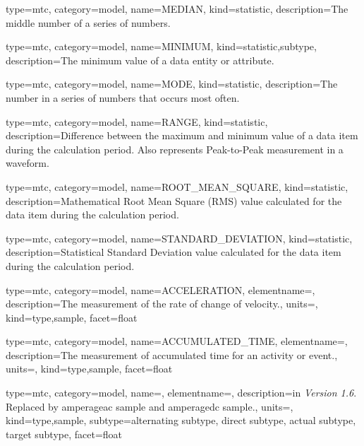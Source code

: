 {
  type=mtc,
  category=model,
  name={MEDIAN},
  kind={statistic},
  description={The middle number of a series of numbers.}
}


{
  type=mtc,
  category=model,
  name={MINIMUM},
  kind={statistic,subtype},
  description={The minimum value of a data entity or attribute.}
}


{
  type=mtc,
  category=model,
  name={MODE},
  kind={statistic},
  description={The number in a series of numbers that occurs most often.}
}


{
  type=mtc,
  category=model,
  name={RANGE},
  kind={statistic},
  description={Difference between the maximum and minimum value of a data item during the calculation period.  Also represents Peak-to-Peak measurement in a waveform.}
}


{
  type=mtc,
  category=model,
  name={ROOT\_MEAN\_SQUARE},
  kind={statistic},
  description={Mathematical Root Mean Square (RMS) value calculated for the data item during the calculation period.}
}


{
  type=mtc,
  category=model,
  name={STANDARD\_DEVIATION},
  kind={statistic},
  description={Statistical Standard Deviation value calculated for the data item during the calculation period.}
}


{
  type=mtc,
  category=model,
  name={ACCELERATION},
  elementname=,
  description={The measurement of the rate of change of velocity.},
  units=,
  kind={type,sample},
  facet={\gls{float}}
}


{
  type=mtc,
  category=model,
  name={ACCUMULATED\_TIME},
  elementname=,
  description={The measurement of accumulated time for an activity or event.},
  units=,
  kind={type,sample},
  facet={\gls{float}}
}


{
  type=mtc,
  category=model,
  name=,
  elementname=,
  description={\DEPRECATED in \textit{Version 1.6}. Replaced by \gls{amperageac sample} and \gls{amperagedc sample}.},
  units=,
  kind={type,sample},
  subtype={\gls{alternating subtype}, \gls{direct subtype}, \gls{actual subtype}, \gls{target subtype}},
  facet={\gls{float}}
}

